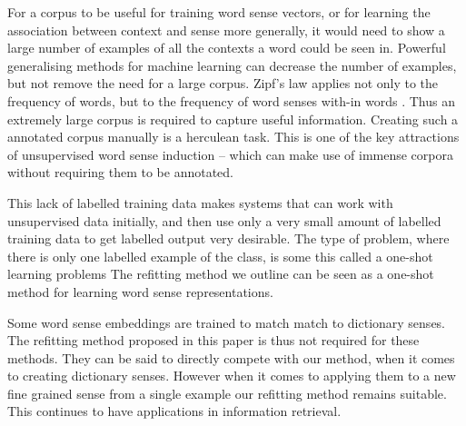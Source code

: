 For a corpus to be useful for training word sense vectors, or for learning the association between context and sense more generally, it would need to show a large number of examples of all the contexts a word could be seen in. Powerful generalising methods for machine learning can decrease the number of examples, but not remove the need for a large corpus.
Zipf's law \parencite{zipf1949human} applies not only to the frequency of words, but to the frequency of word senses with-in words \parencite{Kilgarriff2004}. Thus an extremely large corpus is required to capture useful information. Creating such a annotated corpus manually is a herculean task. This is one of the key attractions of unsupervised word sense induction -- which can make use of immense corpora without requiring them to be annotated.

This lack of labelled training data makes systems that can work with unsupervised data initially, and then use only a very small amount of labelled training data to get labelled output very desirable.
The type of problem, where there is only one labelled example of the class, is some this called a one-shot learning problems
The refitting method we outline can be seen as a one-shot method for learning word sense representations.



Some word sense embeddings are trained to match match to dictionary senses. The refitting method proposed in this paper is thus not required for these methods.
They can be said to directly compete with our method, when it comes to creating dictionary senses. However when it comes to applying them to a new fine grained sense from a single example our refitting method remains suitable. This continues to have applications in information retrieval.
